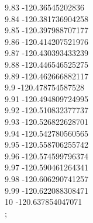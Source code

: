 {9.83	-120.36545202836\\
9.84	-120.381736904258\\
9.85	-120.397988707177\\
9.86	-120.414207521976\\
9.87	-120.430393433239\\
9.88	-120.446546525275\\
9.89	-120.462666882117\\
9.9	-120.478754587528\\
9.91	-120.494809724995\\
9.92	-120.510832377737\\
9.93	-120.526822628701\\
9.94	-120.542780560565\\
9.95	-120.558706255742\\
9.96	-120.574599796374\\
9.97	-120.590461264341\\
9.98	-120.606290741257\\
9.99	-120.622088308471\\
10	-120.637854047071\\
};

